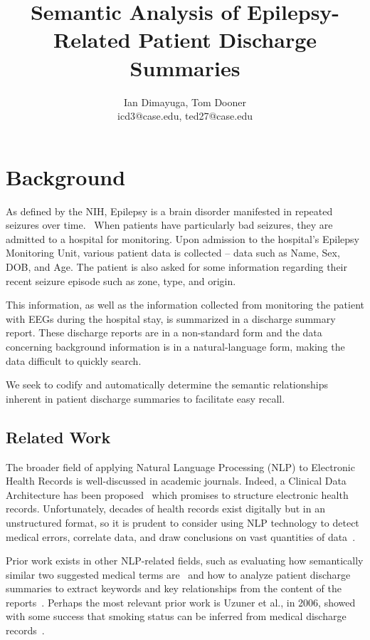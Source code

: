\documentclass[12pt]{article}
\title{Semantic Analysis of Epilepsy-Related Patient Discharge Summaries}
\author{Ian Dimayuga, Tom Dooner \\icd3@case.edu, ted27@case.edu}
\begin{document}
\maketitle

\section{Background}
As defined by the NIH, Epilepsy is a brain disorder manifested in repeated seizures
over time.~\cite{nih-epilepsy} When patients have particularly bad seizures, they
are admitted to a hospital for monitoring. Upon admission to the hospital's Epilepsy
Monitoring Unit, various patient data is collected -- data such as Name, Sex, DOB,
and Age. The patient is also asked for some information regarding their recent seizure
episode such as zone, type, and origin.

This information, as well as the information collected from monitoring the patient
with EEGs during the hospital stay, is summarized in a discharge summary report.
These discharge reports are in a non-standard form and the data concerning background
information is in a natural-language form, making the data difficult to quickly
search.

We seek to codify and automatically determine the semantic relationships inherent
in patient discharge summaries to facilitate easy recall.

\subsection{Related Work}
The broader field of applying Natural Language Processing (NLP) to Electronic Health Records
is well-discussed in academic journals. Indeed, a Clinical Data Architecture has been
proposed~\cite{CDA} which promises to structure electronic health records. Unfortunately,
decades of health records exist digitally but in an unstructured format, so it is prudent
to consider using NLP technology to detect medical errors, correlate data, and draw
conclusions on vast quantities of data~\cite{friedman}.

Prior work exists in other NLP-related fields, such as evaluating how semantically similar 
two suggested medical terms are~\cite{Pedersen2007288} and how to analyze patient
discharge summaries to extract keywords and key relationships from the content of the
reports~\cite{soderland}. Perhaps the most relevant prior work is Uzuner et al., in 2006,
showed with some success that smoking status can be inferred from medical discharge 
records~\cite{Uzuner200814}.
\end{document}
